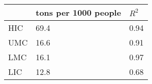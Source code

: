 \begin{tabular}{P{1cm} P{3.5cm} M{1.5cm}}
	\toprule
	    & tons per 1000 people
			& $R^2$    \\
  \midrule
		HIC & 69.4 & 0.94  \\
		UMC & 16.6 & 0.91  \\
		LMC & 16.1 & 0.97  \\
		LIC & 12.8 & 0.68  \\
	\bottomrule
\end{tabular}
